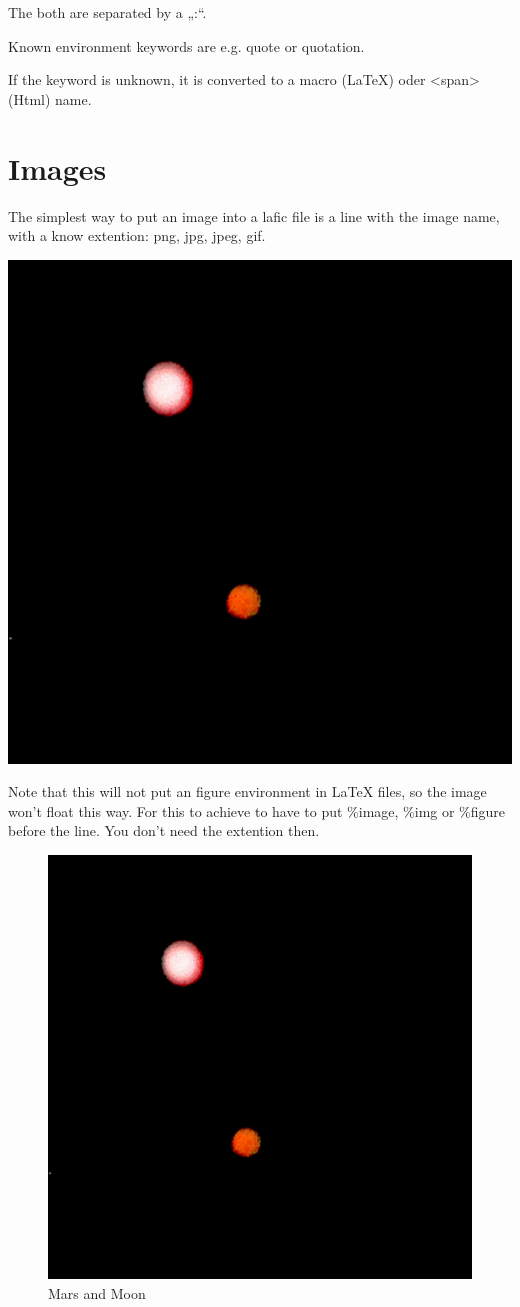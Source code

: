 \documentclass{scrartcl}
\begin{document}
The both are separated by a „:“.

Known environment keywords are e.g. quote or quotation.

If the keyword is unknown, it is converted to a macro
(LaTeX) oder <span> (Html) name.

\section{Images}

The simplest way to put an image into a lafic file is a
line with the image name, with a know extention: png, jpg,
jpeg, gif.

{\includegraphics[width=.50\linewidth]{Image.png}
}

Note that this will not put an figure environment in \LaTeX
files, so the image won't float this way. For this to
achieve to have to put \%image, \%img or \%figure before the
line. You don't need the extention then.

\begin{figure}[hbt]
\includegraphics[height=.40\textheight]{Image.png}
\caption{Mars and Moon}
\label{bild1}

\end{figure}
\end{document}
